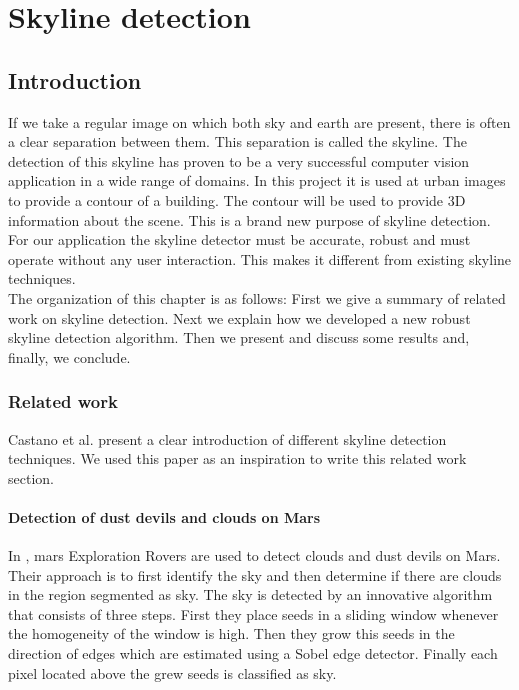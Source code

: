 

\section{Skyline detection}
 \subsection{Introduction}
If we take a regular image on which both sky and earth are present, there
is often a clear separation between them. This separation is called the
skyline. %
The detection of this skyline has proven to be a very successful computer vision
application in a wide range of domains. In this project it is used at urban
images to provide a contour of a building.  The contour will be used to
provide 3D information about the scene. This is a brand new purpose of skyline
detection.\\
For our application the skyline detector must be accurate, robust and must
operate without any user interaction. This makes it different from existing
skyline techniques.\\
The organization of this chapter is as follows:  First we give a summary of
related work on skyline detection.  Next we explain how we developed a new
robust skyline detection algorithm.  Then we present and discuss some results
and, finally, we conclude.

\subsubsection{Related work}
Castano et al. \cite{Dust} present a clear introduction of different skyline
detection techniques. We used this paper as an inspiration to write this related work
section.


\paragraph{Detection of dust devils and clouds on Mars}
In \cite{Dust}, mars Exploration Rovers are used to detect clouds and dust devils on Mars.
Their approach is to first identify the sky and then determine if there are
clouds in the region segmented as sky. The sky is detected by an innovative
algorithm that consists of three steps.  First they place seeds in a sliding
window whenever the homogeneity of the window is high. Then they grow this seeds
in the direction of edges which are estimated using a Sobel edge detector.
Finally each pixel located above the grew seeds is classified as sky.\\


